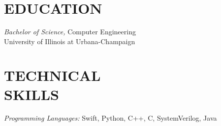 \documentclass[resmargin]{res}
\begin{document}
\begin{resume}
\section{EDUCATION} {\sl Bachelor of Science,} Computer Engineering \\
                University of Illinois at Urbana-Champaign

\section{TECHNICAL \\ SKILLS} 
{\sl Programming Languages:} Swift, Python, C++, C, SystemVerilog, Java\\

\end{resume}
\end{document}
